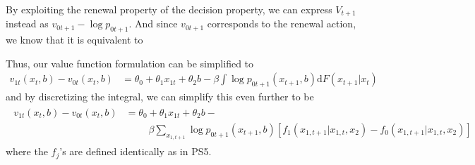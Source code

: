 \documentclass[12pt,english]{article}
\begin{document}
By exploiting the renewal property of the decision property, we can express $V_{t+1}$ instead as $v_{0t+1} - \log p_{0t+1}$. And since $v_{0t+1}$ corresponds to the renewal action, we know that it is equivalent to 

Thus, our value function formulation can be simplified to
\begin{align}\label{eq:condvccp}
    v_{1t}\left(x_{t},b\right)-v_{0t}\left(x_{t},b\right) &= \theta_0 + \theta_1 x_{1t} + \theta_2 b - \beta \int \log p_{0t+1}\left(x_{t+1},b\right) \mathrm{d}F\left(x_{t+1}\vert x_{t}\right)
\end{align}
and by discretizing the integral, we can simplify this even further to be 
\begin{align}\label{eq:condv2}
\begin{split}
    v_{1t}\left(x_{t},b\right)-v_{0t}\left(x_{t},b\right) &= \theta_0 + \theta_1 x_{1t} + \theta_2 b - \\
    &\phantom{\text{===}}\beta \sum_{x_{1,t+1}} \log p_{0t+1}\left(x_{t+1},b\right)\left[f_{1}\left(x_{1,t+1}\vert x_{1,t},x_{2}\right) - f_{0}\left(x_{1,t+1}\vert x_{1,t},x_{2}\right)\right]
    \end{split}
\end{align}
where the $f_j$'s are defined identically as in PS5.
\end{document}
